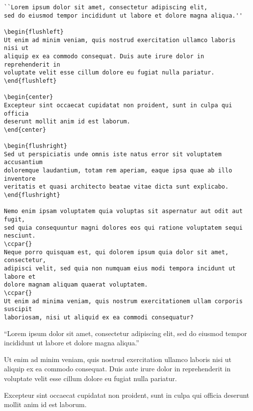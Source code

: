 \begin{lstlisting}[caption={Paragraphs, new lines and text justification.}]
``Lorem ipsum dolor sit amet, consectetur adipiscing elit,
sed do eiusmod tempor incididunt ut labore et dolore magna aliqua.''

\begin{flushleft}
Ut enim ad minim veniam, quis nostrud exercitation ullamco laboris nisi ut
aliquip ex ea commodo consequat. Duis aute irure dolor in reprehenderit in
voluptate velit esse cillum dolore eu fugiat nulla pariatur.
\end{flushleft}

\begin{center}
Excepteur sint occaecat cupidatat non proident, sunt in culpa qui officia
deserunt mollit anim id est laborum.
\end{center}

\begin{flushright}
Sed ut perspiciatis unde omnis iste natus error sit voluptatem accusantium
doloremque laudantium, totam rem aperiam, eaque ipsa quae ab illo inventore
veritatis et quasi architecto beatae vitae dicta sunt explicabo.
\end{flushright}

Nemo enim ipsam voluptatem quia voluptas sit aspernatur aut odit aut fugit,
sed quia consequuntur magni dolores eos qui ratione voluptatem sequi nesciunt.
\ccpar{}
Neque porro quisquam est, qui dolorem ipsum quia dolor sit amet, consectetur,
adipisci velit, sed quia non numquam eius modi tempora incidunt ut labore et
dolore magnam aliquam quaerat voluptatem.
\ccpar{}
Ut enim ad minima veniam, quis nostrum exercitationem ullam corporis suscipit
laboriosam, nisi ut aliquid ex ea commodi consequatur?
\end{lstlisting}

``Lorem ipsum dolor sit amet, consectetur adipiscing elit,
sed do eiusmod tempor incididunt ut labore et dolore magna aliqua.''

\begin{flushleft}
Ut enim ad minim veniam, quis nostrud exercitation ullamco laboris nisi ut
aliquip ex ea commodo consequat. Duis aute irure dolor in reprehenderit in
voluptate velit esse cillum dolore eu fugiat nulla pariatur.
\end{flushleft}

\begin{center}
Excepteur sint occaecat cupidatat non proident, sunt in culpa qui officia
deserunt mollit anim id est laborum.
\end{center}

